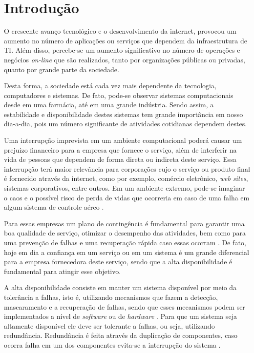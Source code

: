 \chapter{Introdução}
O crescente avanço tecnológico e o desenvolvimento da internet, provocou um aumento no número de aplicações ou serviços que dependem da 
infraestrutura de TI. Além disso, percebe-se um aumento significativo no número de operações e negócios \textit{on-line} que são realizados, 
tanto por organizações públicas ou privadas, quanto por grande parte da sociedade.

Desta forma, a sociedade está cada vez mais dependente da tecnologia, computadores e sistemas. 
De fato, pode-se observar sistemas computacionais desde em uma farmácia, até em uma grande indústria. 
Sendo assim, a estabilidade e disponibilidade destes sistemas tem grande importância em nosso dia-a-dia, 
pois um número significante de atividades cotidianas dependem destes.

Uma interrupção imprevista em um ambiente computacional poderá causar um prejuízo financeiro para a empresa que fornece o serviço, 
além de interferir na vida de pessoas que dependem de forma direta ou indireta deste serviço. 
Essa interrupção terá maior relevância para corporações cujo o serviço ou produto final é fornecido através da internet, 
como por exemplo, comércio eletrônico, \textit{web sites}, sistemas corporativos, entre outros. 
Em um ambiente extremo, pode-se imaginar o caos e o possível risco de perda de vidas que ocorreria em caso de uma falha 
em algum sistema de controle aéreo \cite{costa2009}.

Para essas empresas um plano de contingência é fundamental para garantir uma boa qualidade de serviço, 
otimizar o desempenho das atividades, bem como para uma prevenção de falhas e uma recuperação rápida caso essas ocorram \cite{costa2009}.
De fato, hoje em dia a confiança em um serviço ou em um sistema é um grande diferencial para a empresa fornecedora deste serviço, 
sendo que a alta disponibilidade é fundamental para atingir esse objetivo.

A alta disponibilidade consiste em manter um sistema disponível por meio da tolerância a falhas, isto é, utilizando mecanismos que fazem a 
detecção, mascaramento e a recuperação de falhas, sendo que esses mecanismos podem ser implementados a nível de \textit{software} ou de 
\textit{hardware} \cite{reis2009}. Para que um sistema seja altamente disponível ele deve ser tolerante a falhas, ou seja, utilizando redundância.
Redundância é feita através da duplicação de componentes, caso ocorra falha em um dos componentes evita-se a interrupção do sistema 
\cite{batista2007}.

